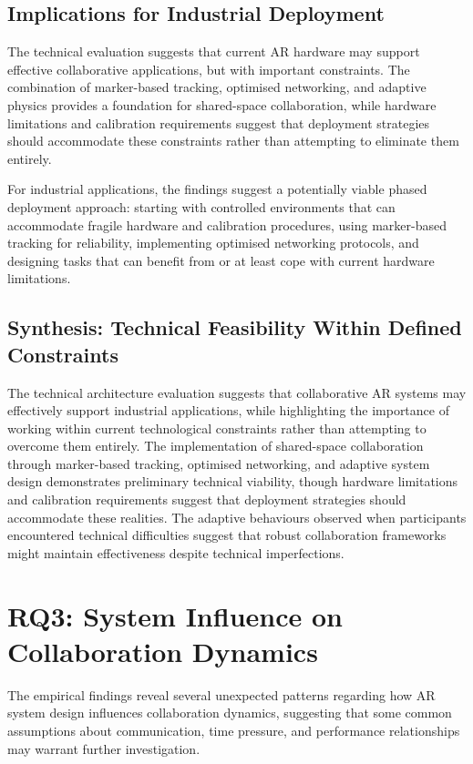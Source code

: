 \subsection{Implications for Industrial Deployment}
The technical evaluation suggests that current AR hardware may support effective collaborative applications, but with important constraints. The combination of marker-based tracking, optimised networking, and adaptive physics provides a foundation for shared-space collaboration, while hardware limitations and calibration requirements suggest that deployment strategies should accommodate these constraints rather than attempting to eliminate them entirely.

For industrial applications, the findings suggest a potentially viable phased deployment approach: starting with controlled environments that can accommodate fragile hardware and calibration procedures, using marker-based tracking for reliability, implementing optimised networking protocols, and designing tasks that can benefit from or at least cope with current hardware limitations.

\subsection{Synthesis: Technical Feasibility Within Defined Constraints}
The technical architecture evaluation suggests that collaborative AR systems may effectively support industrial applications, while highlighting the importance of working within current technological constraints rather than attempting to overcome them entirely. The implementation of shared-space collaboration through marker-based tracking, optimised networking, and adaptive system design demonstrates preliminary technical viability, though hardware limitations and calibration requirements suggest that deployment strategies should accommodate these realities. The adaptive behaviours observed when participants encountered technical difficulties suggest that robust collaboration frameworks might maintain effectiveness despite technical imperfections.

\section{RQ3: System Influence on Collaboration Dynamics}
The empirical findings reveal several unexpected patterns regarding how AR system design influences collaboration dynamics, suggesting that some common assumptions about communication, time pressure, and performance relationships may warrant further investigation.

